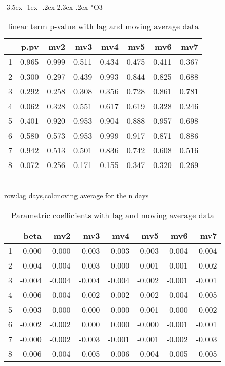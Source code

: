 \documentclass[a4paper, 12pt]{article}
\makeatletter
\def\large{\fontsize{14}{20}\selectfont}
\renewcommand\subsection{\@startsection {subsection}{1}{\z@}%
                                   {-3.5ex \@plus -1ex \@minus -.2ex}%
                                   {2.3ex \@plus.2ex}%
                                   {\centering\normalfont\large\bfseries}}
\makeatother
\begin{document}
\subsection*{O3}
\begin{table}[h]
\centering
\caption{linear term p-value with lag and moving average data}
\begin{tabular}{rrrrrrrr}
  \hline
 & p.pv & mv2 & mv3 & mv4 & mv5 & mv6 & mv7 \\
  \hline
1 & 0.965 & 0.999 & 0.511 & 0.434 & 0.475 & 0.411 & 0.367 \\
  2 & 0.300 & 0.297 & 0.439 & 0.993 & 0.844 & 0.825 & 0.688 \\
  3 & 0.292 & 0.258 & 0.308 & 0.356 & 0.728 & 0.861 & 0.781 \\
  4 & 0.062 & 0.328 & 0.551 & 0.617 & 0.619 & 0.328 & 0.246 \\
  5 & 0.401 & 0.920 & 0.953 & 0.904 & 0.888 & 0.957 & 0.698 \\
  6 & 0.580 & 0.573 & 0.953 & 0.999 & 0.917 & 0.871 & 0.886 \\
  7 & 0.942 & 0.513 & 0.501 & 0.836 & 0.742 & 0.608 & 0.516 \\
  8 & 0.072 & 0.256 & 0.171 & 0.155 & 0.347 & 0.320 & 0.269 \\
   \hline
\end{tabular}
\\row:lag days,col:moving average for the n days
\end{table}

\begin{table}[h]
\centering
\caption{Parametric coefficients with lag and moving average data}
\begin{tabular}{rrrrrrrr}
  \hline
 & beta & mv2 & mv3 & mv4 & mv5 & mv6 & mv7 \\
  \hline
1 & 0.000 & -0.000 & 0.003 & 0.003 & 0.003 & 0.004 & 0.004 \\
  2 & -0.004 & -0.004 & -0.003 & -0.000 & 0.001 & 0.001 & 0.002 \\
  3 & -0.004 & -0.004 & -0.004 & -0.004 & -0.002 & -0.001 & -0.001 \\
  4 & 0.006 & 0.004 & 0.002 & 0.002 & 0.002 & 0.004 & 0.005 \\
  5 & -0.003 & 0.000 & -0.000 & -0.000 & -0.001 & -0.000 & 0.002 \\
  6 & -0.002 & -0.002 & 0.000 & 0.000 & -0.000 & -0.001 & -0.001 \\
  7 & -0.000 & -0.002 & -0.003 & -0.001 & -0.001 & -0.002 & -0.003 \\
  8 & -0.006 & -0.004 & -0.005 & -0.006 & -0.004 & -0.005 & -0.005 \\
   \hline
\end{tabular}
\end{table}
\end{document}
